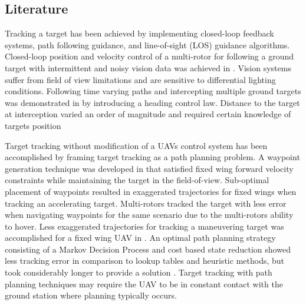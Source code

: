 \documentclass[conference]{IEEEtran}
\begin{document}
\subsection{Literature}
Tracking a target has been achieved by implementing closed-loop feedback systems, path following guidance, and line-of-sight (LOS) guidance algorithms. Closed-loop position and velocity control of a multi-rotor for following a ground target with intermittent and noisy vision data was achieved in \cite{teuliere_chasing_2011}. Vision systems suffer from field of view limitations and are sensitive to differential lighting conditions. Following time varying paths and intercepting multiple ground targets was demonstrated in \cite{oliveira_moving_2016} by introducing a heading control law. Distance to the target at interception varied an order of magnitude and required certain knowledge of targets position 

Target tracking without modification of a UAVs control system has been accomplished by framing target tracking as a path planning problem. A waypoint generation technique was developed in \cite{ariyur_autonomous_2008} that satisfied fixed wing forward velocity constraints while maintaining the target in the field-of-view. Sub-optimal placement of waypoints resulted in exaggerated trajectories for fixed wings when tracking an accelerating target. Multi-rotors tracked the target with less error when navigating waypoints for the same scenario due to the multi-rotors ability to hover. Less exaggerated trajectories for tracking a maneuvering target was accomplished for a fixed wing UAV in \cite{lee_strategies_2003}.  An optimal path planning strategy consisting of a Markov Decision Process and cost based state reduction showed less tracking error in comparison to lookup tables and heuristic methods, but took considerably longer to provide a solution \cite{baek_optimal_2013}. Target tracking with path planning techniques may require the UAV to be in constant contact with the ground station where planning typically occurs.  
\end{document}
